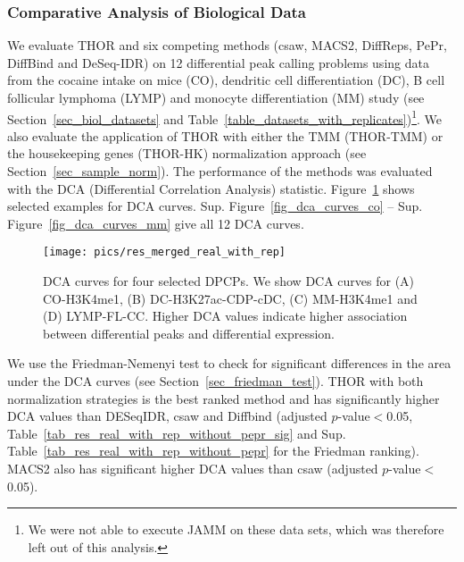 \subsubsection{Comparative Analysis of Biological Data}
We evaluate THOR and six competing methods (csaw, MACS2, DiffReps, PePr, DiffBind and DeSeq-IDR) on 12 differential peak calling problems using data from the cocaine intake on mice (CO), dendritic cell differentiation (DC), B cell follicular lymphoma (LYMP) and monocyte differentiation (MM) study (see Section~\ref{sec_biol_datasets} and Table~\ref{table_datasets_with_replicates})\footnote{We were not able to execute JAMM on these data sets, which was therefore left out of this analysis.}. 
We also evaluate the application of THOR with either the TMM (THOR-TMM) or the housekeeping genes (THOR-HK) normalization approach (see Section~\ref{sec_sample_norm}).
The performance of the methods was evaluated with the DCA (Differential Correlation Analysis) statistic. 
Figure~\ref{fig_res_real_datasets_with_rep} shows selected examples for DCA curves.
Sup. Figure~\ref{fig_dca_curves_co} -- Sup. Figure~\ref{fig_dca_curves_mm} give all 12 DCA curves.

\begin{figure}[ht]
  \begin{center}
    \texttt{[image: pics/res\_merged\_real\_with\_rep]}
  \end{center}
\caption[Selection of DCA curves]{DCA curves for four selected DPCPs. 
We show DCA curves for (A) CO-H3K4me1, (B) DC-H3K27ac-CDP-cDC, (C) MM-H3K4me1 and (D) LYMP-FL-CC. 
Higher DCA values indicate higher association between differential peaks and differential expression.}
\label{fig_res_real_datasets_with_rep}
\end{figure}

We use the Friedman-Nemenyi test to check for significant differences in the area under the DCA curves (see Section~\ref{sec_friedman_test}).
THOR with both normalization strategies is the best ranked method and has significantly higher DCA values than DESeqIDR, csaw and Diffbind (adjusted $p$-value$<$0.05, Table~\ref{tab_res_real_with_rep_without_pepr_sig} and Sup. Table~\ref{tab_res_real_with_rep_without_pepr} for the Friedman ranking).
MACS2 also has significant higher DCA values than csaw (adjusted $p$-value$<$0.05).

